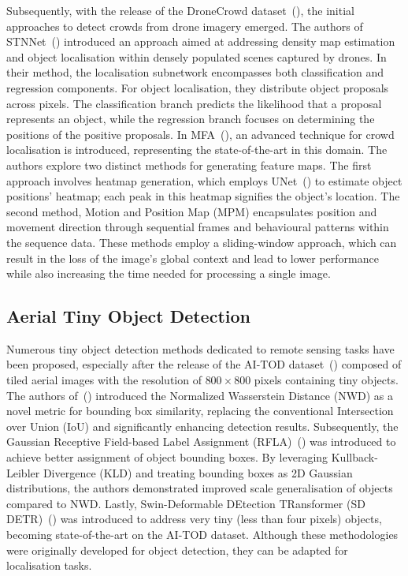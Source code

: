 Subsequently, with the release of the DroneCrowd dataset~(\cite{wen2021detection}), the initial approaches to detect crowds from drone imagery emerged. The authors of STNNet~(\cite{wen2021detection}) introduced an approach aimed at addressing density map estimation and object localisation within densely populated scenes captured by drones. In their method, the localisation subnetwork encompasses both classification and regression components. For object localisation, they distribute object proposals across pixels. The classification branch predicts the likelihood that a proposal represents an object, while the regression branch focuses on determining the positions of the positive proposals. In MFA~(\cite{asanomi2023multi}), an advanced technique for crowd localisation is introduced, representing the state-of-the-art in this domain. The authors explore two distinct methods for generating feature maps. The first approach involves heatmap generation, which employs UNet~(\cite{unet}) to estimate object positions' heatmap; each peak in this heatmap signifies the object's location. The second method, Motion and Position Map (MPM) encapsulates position and movement direction through sequential frames and behavioural patterns within the sequence data. These methods employ a sliding-window approach, which can result in the loss of the image's global context and lead to lower performance while also increasing the time needed for processing a single image.

\subsection{Aerial Tiny Object Detection}

Numerous tiny object detection methods dedicated to remote sensing tasks have been proposed, especially after the release of the AI-TOD dataset~(\cite{wang2021tiny}) composed of tiled aerial images with the resolution of $800\times800$ pixels containing tiny objects. The authors of~(\cite{wang2110normalized}) introduced the Normalized Wasserstein Distance (NWD) as a novel metric for bounding box similarity, replacing the conventional Intersection over Union (IoU) and significantly enhancing detection results. Subsequently, the Gaussian Receptive Field-based Label Assignment (RFLA)~(\cite{xu2022rfla}) was introduced to achieve better assignment of object bounding boxes. By leveraging Kullback-Leibler Divergence (KLD) and treating bounding boxes as 2D Gaussian distributions, the authors demonstrated improved scale generalisation of objects compared to NWD. Lastly, Swin-Deformable DEtection TRansformer (SD DETR)~(\cite{liao2023transformer}) was introduced to address very tiny (less than four pixels) objects, becoming state-of-the-art on the AI-TOD dataset. Although these methodologies were originally developed for object detection, they can be adapted for localisation tasks.

